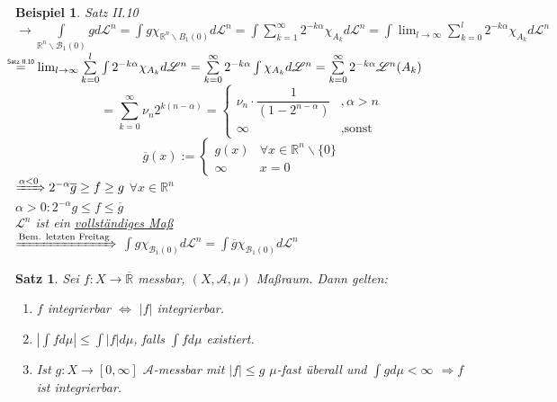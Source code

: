 \documentclass[11pt]{memoir}
\theoremstyle{changebreak}
\newtheorem{Beispiel}{Beispiel}[chapter]
\newtheorem{Satz}{Satz}[chapter]
\newcommand\overequal[1]{\mathrel{\overset{\makebox[0pt]{\mbox{\normalfont\tiny\sffamily $ #1 $}}}{=}}}
\begin{document}
\begin{Beispiel}
Satz II.10 \\
$\rightarrow \int\limits_{\mathbb R^n\backslash \mathscr B_1(0)} g d\mathscr L^n = \int g\chi_{\mathbb R^n\backslash B_1(0)} d\mathscr L^n = \int \sum\limits_{k=1}^\infty 2^{-k\alpha}\chi_{A_k} d\mathscr L^n = \int \lim_{l \rightarrow \infty} \sum\limits_{k=0}^l 2^{-k\alpha} \chi_{A_k} d\mathscr L^n$
$\overequal{\text{Satz II.10}} \, \, \, \, \lim_{l \rightarrow \infty} \sum\limits_{k=0}^l \int 2^{-k\alpha}\chi_{A_k} d\mathscr L^n = \sum\limits_{k=0}^\infty 2^{-k\alpha} \int \chi_{A_k} d\mathscr L^n = \sum\limits_{k=0}^\infty 2^{-k\alpha} \mathscr L^n (A_k)$ \\
\begin{equation}
= \sum\limits_{k=0}^\infty  \nu_n 2^{k(n-\alpha)} =
\begin{cases}
	\nu_n \cdotp \dfrac{1}{(1-2^{n-\alpha})} & , \alpha > n \\
	\infty & , \text{sonst}
\end{cases}
\end{equation}
\begin{equation}
\overline{g}(x) :=
\begin{cases}
	g(x) & \forall x \in \mathbb R^n \backslash \{0\} \\
	\infty & x = 0
\end{cases}
\end{equation}
$\xRightarrow{\alpha < 0} 2^{-\alpha}\overline{g} \geq f \geq g$ $\forall x \in \mathbb R^n$ \\
$\alpha > 0: 2^{-\alpha}g \leq f \leq \overline g$ \\
$\mathscr L^n$ ist ein \underline{vollständiges Maß} \\
$\xRightarrow{\text{Bem. letzten Freitag}}$ $\int g \chi_{\mathscr B_1 (0)} d\mathscr L^n = \int \overline g \chi_{\mathscr B_1(0)} d\mathscr L^n$
\end{Beispiel}

\begin{Satz}
Sei $f: X \rightarrow \overline{\mathbb R}$ messbar, $(X, \mathscr A, \mu)$ Maßraum. Dann gelten:
\begin{enumerate}
	\item $f$ integrierbar $\Leftrightarrow$ $|f|$ integrierbar.
	\item $\left| \int f d\mu \right| \leq \int |f| d\mu$, falls $\int f d\mu$ existiert.
	\item Ist $g: X \rightarrow [0, \infty]$ $\mathscr A$-messbar mit $|f| \leq g$ $\mu$-fast überall und $\int g d\mu < \infty$ $\Rightarrow f$ ist integrierbar.
\end{enumerate}
\end{Satz}
\end{document}
